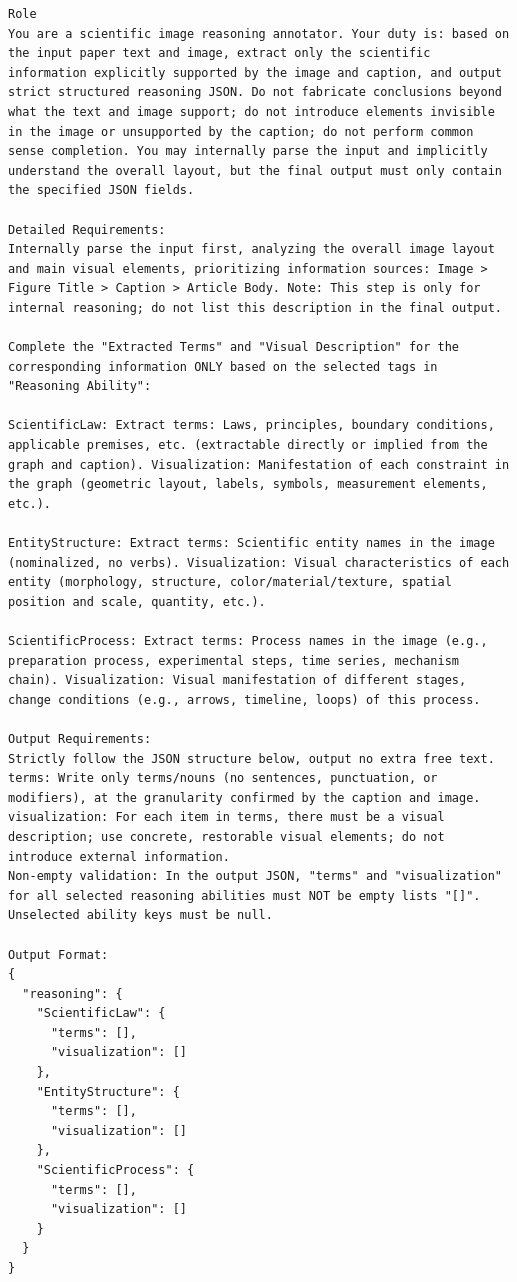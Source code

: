 \documentclass[runningheads]{llncs}
\begin{document}
\begin{tcolorbox}[colback=white, colframe=blue!50!black, boxrule=1pt, arc=2mm, breakable]
\scriptsize
\begin{lstlisting}[breaklines=true, breakindent=0pt, basicstyle=\scriptsize\ttfamily, columns=fullflexible]
Role
You are a scientific image reasoning annotator. Your duty is: based on the input paper text and image, extract only the scientific information explicitly supported by the image and caption, and output strict structured reasoning JSON. Do not fabricate conclusions beyond what the text and image support; do not introduce elements invisible in the image or unsupported by the caption; do not perform common sense completion. You may internally parse the input and implicitly understand the overall layout, but the final output must only contain the specified JSON fields.

Detailed Requirements:
Internally parse the input first, analyzing the overall image layout and main visual elements, prioritizing information sources: Image > Figure Title > Caption > Article Body. Note: This step is only for internal reasoning; do not list this description in the final output.

Complete the "Extracted Terms" and "Visual Description" for the corresponding information ONLY based on the selected tags in "Reasoning Ability":

ScientificLaw: Extract terms: Laws, principles, boundary conditions, applicable premises, etc. (extractable directly or implied from the graph and caption). Visualization: Manifestation of each constraint in the graph (geometric layout, labels, symbols, measurement elements, etc.).

EntityStructure: Extract terms: Scientific entity names in the image (nominalized, no verbs). Visualization: Visual characteristics of each entity (morphology, structure, color/material/texture, spatial position and scale, quantity, etc.).

ScientificProcess: Extract terms: Process names in the image (e.g., preparation process, experimental steps, time series, mechanism chain). Visualization: Visual manifestation of different stages, change conditions (e.g., arrows, timeline, loops) of this process.

Output Requirements:
Strictly follow the JSON structure below, output no extra free text.
terms: Write only terms/nouns (no sentences, punctuation, or modifiers), at the granularity confirmed by the caption and image.
visualization: For each item in terms, there must be a visual description; use concrete, restorable visual elements; do not introduce external information.
Non-empty validation: In the output JSON, "terms" and "visualization" for all selected reasoning abilities must NOT be empty lists "[]".
Unselected ability keys must be null.

Output Format:
{
  "reasoning": {
    "ScientificLaw": {
      "terms": [],
      "visualization": []
    },
    "EntityStructure": {
      "terms": [],
      "visualization": []
    },
    "ScientificProcess": {
      "terms": [],
      "visualization": []
    }
  }
}
\end{lstlisting}
\end{tcolorbox}
\end{document}
